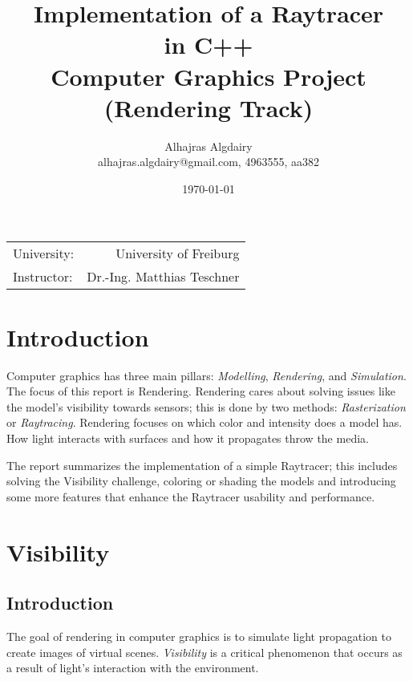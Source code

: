 \documentclass{article}
\title{Implementation of a Raytracer \\ in C++ \\ Computer Graphics Project (Rendering Track)} %
\author{Alhajras Algdairy \\alhajras.algdairy@gmail.com, 4963555, aa382} %
\date{\today} %
\begin{document}
	
	\maketitle %
	
	\begin{center}
		\begin{tabular}{l r}
			University: & University of Freiburg \\ %
			Instructor: &Dr.-Ing. Matthias Teschner %
		\end{tabular}
	\end{center}
	\clearpage
	
	\tableofcontents
	\clearpage
	\section{Introduction}
	Computer graphics has three main pillars: \textit{Modelling}, \textit{Rendering}, and \textit{Simulation}. The focus of this report is Rendering. Rendering cares about solving issues like the model's visibility towards sensors; this is done by two methods: \textit{Rasterization} or \textit{Raytracing}. Rendering focuses on which color and intensity does a model has. How light interacts with surfaces and how it propagates throw the media.
	
	The report summarizes the implementation of a simple Raytracer; this includes solving the Visibility challenge, coloring or shading the models and introducing some more features that enhance the Raytracer usability and performance.
	
	\section{Visibility}
	\subsection{Introduction}
	The goal of rendering in computer graphics is to simulate light propagation to create images of virtual scenes. \textit{Visibility} is a critical phenomenon that occurs as a result of light's interaction with the environment.
	
\end{document}
